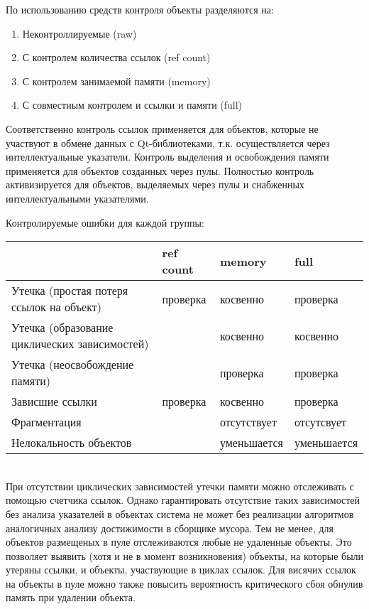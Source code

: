 \documentclass{article}
\begin{document}
По использованию средств контроля объекты разделяются на:
\begin{enumerate}
\item  Неконтроллируемые (raw)

\item  С контролем количества ссылок (ref count)

\item  С контролем занимаемой памяти (memory)

\item  С совместным контролем и ссылки и памяти (full)
\end{enumerate}
Соответственно контроль ссылок применяется для объектов, которые не участвуют в обмене данных с Qt-библиотеками, т.к. осуществляется через интеллектуальные указатели. Контроль выделения и освобождения памяти применяется для объектов созданных через пулы. Полностью контроль активизируется для объектов, выделяемых через пулы и снабженных интеллектуальными указателями.

Контролируемые ошибки для каждой группы:\\
\begin{tabular}{|p{1.9in}|p{0.6in}|p{0.8in}|p{0.8in}|} 
\hline & ref count & memory & full \\
\hline Утечка (простая потеря ссылок на объект)  & проверка & косвенно & проверка \\ 
\hline Утечка (образование циклических зависимостей)  &  & косвенно & косвенно \\
\hline Утечка (неосвобождение памяти)  &  & проверка & проверка \\
\hline Зависшие ссылки  & проверка & косвенно & проверка \\
\hline Фрагментация  &  & отсутствует & отсутсвует \\
\hline Нелокальность объектов &  & уменьшается & уменьшается \\ \hline
\end{tabular}\\

При отсутствии циклических зависимостей утечки памяти можно отслеживать с помощью счетчика ссылок. Однако гарантировать отсутствие таких зависимостей без анализа указателей в объектах система не может без реализации алгоритмов аналогичных анализу достижимости в сборщике мусора.  Тем не менее, для объектов размещеных в пуле отслеживаются любые не удаленные объекты. Это позволяет выявить (хотя и не в момент возникновения) объекты, на которые были утеряны ссылки, и объекты, участвующие в циклах ссылок. Для висячих ссылок на объекты в пуле можно также повысить вероятность критического сбоя обнулив память при удалении объекта.  
\end{document}
